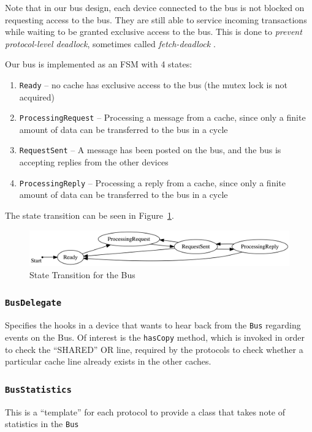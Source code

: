 \documentclass[nonacm,acmsmall,screen,11pt]{acmart}
\begin{document}
Note that in our bus design, each device connected to the bus is not blocked on requesting access to the bus.
They are still able to service incoming transactions while waiting to be granted exclusive access to the bus.
This is done to \emph{prevent protocol-level deadlock}, sometimes called \emph{fetch-deadlock} \cite{Culler:1998:PCA:2821564}.

Our bus is implemented as an FSM with 4 states:
\begin{enumerate}
  \item \texttt{Ready} -- no cache has exclusive access to the bus (the mutex lock is not acquired)
  \item \texttt{ProcessingRequest} -- Processing a message from a cache, since only a finite amount of data can be transferred to the bus in a cycle
  \item \texttt{RequestSent} -- A message has been posted on the bus, and the bus is accepting replies from the other devices
  \item \texttt{ProcessingReply} -- Processing a reply from a cache, since only a finite amount of data can be transferred to the bus in a cycle
\end{enumerate}

The state transition can be seen in Figure~\ref{fig:bus}.

\begin{figure}[htb!]
  \centering
  \includegraphics[width=\textwidth]{bus}
  \caption{State Transition for the Bus}
  \label{fig:bus}
\end{figure}

\subsubsection{\texttt{BusDelegate}}
Specifies the hooks in a device that wants to hear back from the \texttt{Bus} regarding events on the Bus.
Of interest is the \texttt{hasCopy} method, which is invoked in order to check the ``SHARED'' OR line, required by the protocols to check whether a particular cache line already exists in the other caches.

\subsubsection{\texttt{BusStatistics}}
This is a ``template'' for each protocol to provide a class that takes note of statistics in the \texttt{Bus}
\end{document}
